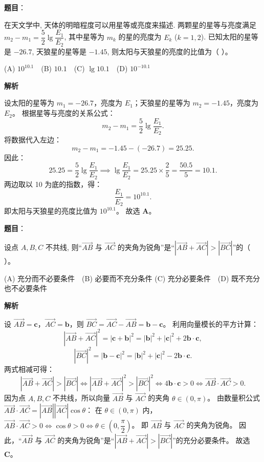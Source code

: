 \begin{answer}

\textbf{题目}：

在天文学中, 天体的明暗程度可以用星等或亮度来描述. 两颗星的星等与亮度满足 $m_2 - m_1 = \dfrac{5}{2}\lg \dfrac{E_1}{E_2}$, 其中星等为 $m_k$ 的星的亮度为 $E_k$ ($k = 1, 2$). 已知太阳的星等是 $-26.7$, 天狼星的星等是 $-1.45$, 则太阳与天狼星的亮度的比值为（ ）。

(A) $10^{10.1}$　(B) $10.1$　(C) $\lg 10.1$　(D) $10^{-10.1}$

\textbf{解析}

设太阳的星等为 $m_1 = -26.7$，亮度为 $E_1$；天狼星的星等为 $m_2 = -1.45$，亮度为 $E_2$。
根据星等与亮度的关系公式：
\nopagebreak[4]
\[m_2 - m_1 = \frac{5}{2} \lg \frac{E_1}{E_2}.\]
将数据代入左边：
\nopagebreak[4]
\[m_2 - m_1 = -1.45 - (-26.7) = 25.25.\]
因此：
\nopagebreak[4]
\[25.25 = \frac{5}{2} \lg \frac{E_1}{E_2} \implies \lg \frac{E_1}{E_2} = 25.25 \times \frac{2}{5} = \frac{50.5}{5} = 10.1.\]
两边取以 10 为底的指数，得：
\nopagebreak[4]
\[\frac{E_1}{E_2} = 10^{10.1}.\]
即太阳与天狼星的亮度比值为 $10^{10.1}$。
故选 \textbf{A}。


\end{answer}
\begin{answer}

\textbf{题目}：

设点 $A, B, C$ 不共线, 则“$\vec{AB}$ 与 $\vec{AC}$ 的夹角为锐角”是“$|\vec{AB} + \vec{AC}| > |\vec{BC}|$”的（ ）。

(A) 充分而不必要条件　(B) 必要而不充分条件  
(C) 充分必要条件　(D) 既不充分也不必要条件

\textbf{解析}

设 $\vec{AB} = \boldsymbol{c}$，$\vec{AC} = \boldsymbol{b}$，则 $\vec{BC} = \vec{AC} - \vec{AB} = \boldsymbol{b} - \boldsymbol{c}$。
利用向量模长的平方计算：
\nopagebreak[4]
\[|\vec{AB} + \vec{AC}|^2 = |\boldsymbol{c} + \boldsymbol{b}|^2 = |\boldsymbol{b}|^2 + |\boldsymbol{c}|^2 + 2\boldsymbol{b} \cdot \boldsymbol{c},\]
\nopagebreak[4]
\[|\vec{BC}|^2 = |\boldsymbol{b} - \boldsymbol{c}|^2 = |\boldsymbol{b}|^2 + |\boldsymbol{c}|^2 - 2\boldsymbol{b} \cdot \boldsymbol{c}.\]
两式相减可得：
\nopagebreak[4]
\[|\vec{AB} + \vec{AC}| > |\vec{BC}| \iff |\vec{AB} + \vec{AC}|^2 > |\vec{BC}|^2 \iff 4\boldsymbol{b} \cdot \boldsymbol{c} > 0 \iff \vec{AB} \cdot \vec{AC} > 0.\]
因为点 $A, B, C$ 不共线，所以向量 $\vec{AB}$ 与 $\vec{AC}$ 的夹角 $\theta \in (0, \pi)$。
由数量积公式 $\vec{AB} \cdot \vec{AC} = |\vec{AB}||\vec{AC}|\cos\theta$：
在 $\theta \in (0, \pi)$ 内，$\vec{AB} \cdot \vec{AC} > 0 \iff \cos\theta > 0 \iff \theta \in \left(0, \dfrac{\pi}{2}\right)$。
即 $\vec{AB}$ 与 $\vec{AC}$ 的夹角为锐角。
因此，“$\vec{AB}$ 与 $\vec{AC}$ 的夹角为锐角”是“$|\vec{AB} + \vec{AC}| > |\vec{BC}|$”的充分必要条件。
故选 \textbf{C}。


\end{answer}
